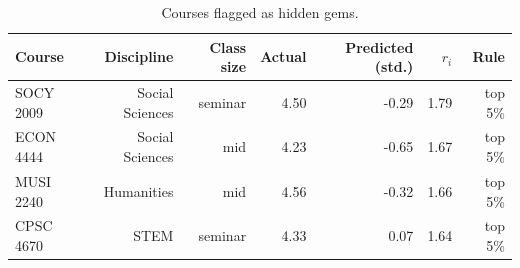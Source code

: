 \begin{table}[h]
  \centering
  \caption{Courses flagged as hidden gems.}
  \label{tab:gems}
\begin{tabular}{lrrrrrr}
\toprule
Course & Discipline & Class size & Actual & Predicted (std.) & $r_i$ & Rule \\
\midrule
SOCY 2009 & Social Sciences & seminar & 4.50 & -0.29 & 1.79 & top 5\% \\
ECON 4444 & Social Sciences & mid & 4.23 & -0.65 & 1.67 & top 5\% \\
MUSI 2240 & Humanities & mid & 4.56 & -0.32 & 1.66 & top 5\% \\
CPSC 4670 & STEM & seminar & 4.33 & 0.07 & 1.64 & top 5\% \\
\bottomrule
\end{tabular}
\end{table}
